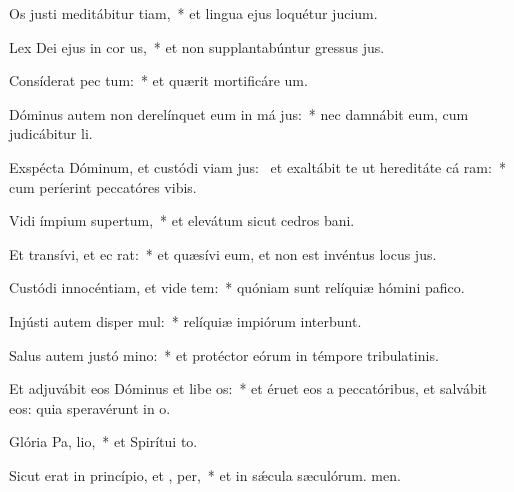 \item Os justi meditábitur tiam,~* et lingua ejus loquétur jucium.
\item Lex Dei ejus in cor us,~* et non supplantabúntur gressus jus.
\item Consíderat pec tum:~* et quærit mortificáre um.
\item Dóminus autem non derelínquet eum in má jus:~* nec damnábit eum, cum judicábitur li.
\item Exspécta Dóminum, et custódi viam jus:~\pscross{} et exaltábit te ut hereditáte cá ram:~* cum períerint peccatóres vibis.
\item Vidi ímpium supertum,~* et elevátum sicut cedros bani.
\item Et transívi, et ec  rat:~* et quæsívi eum, et non est invéntus locus jus.
\item Custódi innocéntiam, et vide tem:~* quóniam sunt relíquiæ hómini pafico.
\item Injústi autem disper mul:~* relíquiæ impiórum interbunt.
\item Salus autem justó  mino:~* et protéctor eórum in témpore tribulatinis.
\item Et adjuvábit eos Dóminus et libe os:~* et éruet eos a peccatóribus, et salvábit eos: quia speravérunt in o.
\item Glória Pa,  lio,~* et Spirítui to.
\item Sicut erat in princípio, et ,  per,~* et in sǽcula sæculórum. men.
